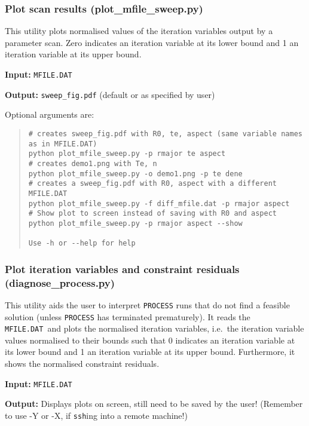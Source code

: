 \documentclass[11pt,a4paper]{article}
\newcommand{\mfile}{\mbox{\texttt{MFILE.DAT}}}
\newcommand{\process}{\mbox{\texttt{PROCESS}}}
\begin{document}
\subsubsection{Plot scan results (plot\_mfile\_sweep.py)}

This utility plots normalised values of the iteration variables output by a parameter scan. Zero indicates an iteration variable at its lower bound and 1 an iteration variable at its upper bound.

\begin{description}
\item{\textbf{Input:}}
 \mfile

\item{\textbf{Output:}}
\texttt{sweep\_fig.pdf} (default or as specified by user)
\end{description}

Optional arguments are:
\begin{quote}
\begin{verbatim}
# creates sweep_fig.pdf with R0, te, aspect (same variable names as in MFILE.DAT)
python plot_mfile_sweep.py -p rmajor te aspect
# creates demo1.png with Te, n
python plot_mfile_sweep.py -o demo1.png -p te dene
# creates a sweep_fig.pdf with R0, aspect with a different MFILE.DAT
python plot_mfile_sweep.py -f diff_mfile.dat -p rmajor aspect
# Show plot to screen instead of saving with R0 and aspect
python plot_mfile_sweep.py -p rmajor aspect --show

Use -h or --help for help

\end{verbatim}
\end{quote}

\subsubsection{Plot iteration variables and constraint residuals (diagnose\_process.py)}

This utility aids the user to interpret \process\/ runs that do not find a feasible solution (unless \process\/ has terminated prematurely). It reads the \mfile\ and plots
the normalised iteration variables, i.e.\ the iteration variable values
normalised to their bounds such that 0 indicates an iteration variable at its
lower bound and 1 an iteration variable at its upper bound. Furthermore, it
shows the normalised constraint residuals.

\begin{description}
\item{\textbf{Input:}}
 \mfile

\item{\textbf{Output:}}
  Displays plots on screen, still need to be saved by the user! (Remember to
  use -Y or -X, if \texttt{ssh}ing into a remote machine!)

\end{description}
\end{document}
